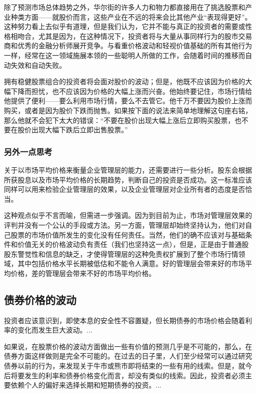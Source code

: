 \documentclass[12pt,oneside]{book}
\begin{document}
除了预测市场总体趋势之外，华尔街的许多人力和物力都直接用在了挑选股票和产业种类方面——就股价而言，这些产业在不远的将来会比其他产业“表现得更好”。这种努力看上去似乎有道理，但是我们认为，它并不能与真正的投资者的需要或性格相吻合，尤其是因为，在这种情况下，投资者将与大量从事同样行为的股市交易商和优秀的金融分析师展开竞争。与看重价格波动和轻视价值基础的所有其他行为一样，经常在这一领域施展本领的一些聪明人所做的工作，会随着时间的推移而自动失效和自动失败。

拥有稳健股票组合的投资者将会面对股价的波动；但是，他既不应该因为价格的大幅下降而担忧，也不应该因为价格的大幅上涨而兴奋。他始终要记住，市场行情给他提供了便利——要么利用市场行情，要么不去管它。他千万不要因为股价上涨而购买，或者是因为股价下跌而抛售。如果按下面的说法来简单地理解这句座右铭，那么他就不会犯下太大的错误：“不要在股价出现大幅上涨后立即购买股票，也不要在股价出现大幅下跌后立即出售股票。”

\subsubsection{另外一点思考}
关于以市场平均价格来衡量企业管理层的能力，还需要进行一些分析。股东会根据所获股息以及市场平均价格的长期趋势，判断自己的投资是否成功。这一标准应该同样可以用来检验企业管理层的效果，以及企业管理层对企业所有者的态度是否恰当。

这种观点似乎不言而喻，但需进一步强调。因为到目前为止，市场对管理层效果的评判并没有一个公认的手段或方法。另一方面，管理层却始终坚持认为，他们对自己股票的市场价值所发生的变化没有任何责任。当然，他们的确不应该对与基础条件和价值无关的价格波动负有责任（我们也坚持这一点），但是，正是由于普通股股东警觉性和信息的缺乏，才使得管理层的这种免责权扩展到了整个市场行情领域，其中包括价格水平长期被低估和不能令人满意。好的管理层会带来好的市场平均价格，差的管理层会带来不好的市场平均价格。

\subsection{债券价格的波动}
投资者应该意识到，即使本息的安全性不容置疑，但长期债券的市场价格会随着利率的变化而发生巨大波动。...


如果说，在股票价格的波动方面做出一些有价值的预测几乎是不可能的，那么，在债券方面这样做则是完全不可能的。在过去的日子里，人们至少经常可以通过研究债券以前的行为，来发现关于牛市或熊市即将结束的一些有用的线索。但是，就今后将要发生的利率和债券价格变化而言，却没有类似的线索。因此，投资者必须主要依赖个人的偏好来选择长期和短期债券的投资。...
\end{document}
